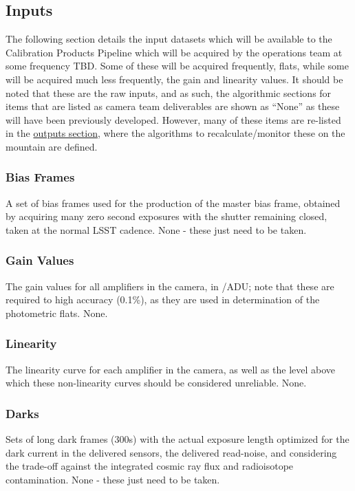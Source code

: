 
\subsection{Inputs}
\label{sec:CPP:inputs} 
The following section details the input datasets which will be available to the Calibration Products Pipeline which will be acquired by the operations team at some frequency TBD. Some of these will be acquired frequently, \eg flats, while some will be acquired much less frequently, \eg the gain and linearity values. It should be noted that these are the raw inputs, and as such, the algorithmic sections for items that are listed as camera team deliverables are shown as ``None'' as these will have been previously developed. However, many of these items are re-listed in the \hyperref[sec:CPP:output]{outputs section}, where the algorithms to recalculate/monitor these on the mountain are defined.


\subsubsection{Bias Frames}\label{sec:CPP:inputs:biases} 
A set of bias frames used for the production of the master bias frame, obtained by acquiring many zero second exposures with the shutter remaining closed, taken at the normal LSST cadence.
\alg None - these just need to be taken.


\subsubsection{Gain Values}\label{sec:CPP:inputs:gain} 
\cameraTeam
The gain values for all amplifiers in the camera, in \electron/ADU; note that these are required to high accuracy (0.1\%), as they are used in determination of the photometric flats.
\alg None.


\subsubsection{Linearity}\label{sec:CPP:inputs:linearityCurve} 
\cameraTeam
The linearity curve for each amplifier in the camera, as well as the level above which these non-linearity curves should be considered unreliable.
\alg None.


\subsubsection{Darks}\label{sec:CPP:inputs:dark}
Sets of long dark frames (\smalltilde 300s) with the actual exposure length optimized for the dark current in the delivered sensors, the delivered read-noise, and considering the trade-off against the integrated cosmic ray flux and radioisotope contamination.
\alg None - these just need to be taken.


